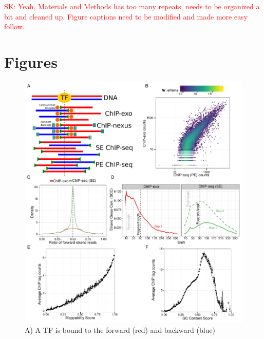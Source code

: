 \documentclass{bmcart}
\newcommand{\SK}[1]{\textcolor{red}{SK: #1}}
\begin{document}
\SK{Yeah, Materials and Methods has too many repeats, needs to be
  organized a bit and cleaned up. Figure captions need to be modified
  and made more easy follow. } 

  
\nocite{exo_gb}
\nocite{maplot1}
\nocite{maplot2}
\nocite{chipbeyond}
\nocite{meme}




\newpage

\section{Figures}


\begin{figure}[h!]
  \centering
  \includegraphics[width = .95\textwidth]{figures/fig1/fig1.pdf}
  \caption{A) A TF is bound to the forward (red) and backward (blue)
}
\end{figure}
\end{document}
